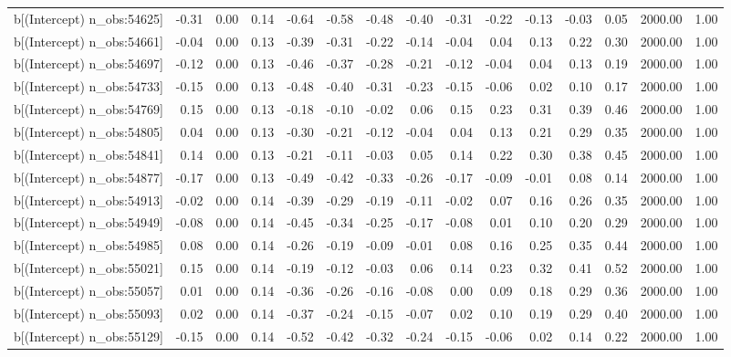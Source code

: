 \begin{table}[ht]
\begin{tabular}{rrrrrrrrrrrrrrr}
  b[(Intercept) n\_obs:54625] & -0.31 & 0.00 & 0.14 & -0.64 & -0.58 & -0.48 & -0.40 & -0.31 & -0.22 & -0.13 & -0.03 & 0.05 & 2000.00 & 1.00 \\ 
  b[(Intercept) n\_obs:54661] & -0.04 & 0.00 & 0.13 & -0.39 & -0.31 & -0.22 & -0.14 & -0.04 & 0.04 & 0.13 & 0.22 & 0.30 & 2000.00 & 1.00 \\ 
  b[(Intercept) n\_obs:54697] & -0.12 & 0.00 & 0.13 & -0.46 & -0.37 & -0.28 & -0.21 & -0.12 & -0.04 & 0.04 & 0.13 & 0.19 & 2000.00 & 1.00 \\ 
  b[(Intercept) n\_obs:54733] & -0.15 & 0.00 & 0.13 & -0.48 & -0.40 & -0.31 & -0.23 & -0.15 & -0.06 & 0.02 & 0.10 & 0.17 & 2000.00 & 1.00 \\ 
  b[(Intercept) n\_obs:54769] & 0.15 & 0.00 & 0.13 & -0.18 & -0.10 & -0.02 & 0.06 & 0.15 & 0.23 & 0.31 & 0.39 & 0.46 & 2000.00 & 1.00 \\ 
  b[(Intercept) n\_obs:54805] & 0.04 & 0.00 & 0.13 & -0.30 & -0.21 & -0.12 & -0.04 & 0.04 & 0.13 & 0.21 & 0.29 & 0.35 & 2000.00 & 1.00 \\ 
  b[(Intercept) n\_obs:54841] & 0.14 & 0.00 & 0.13 & -0.21 & -0.11 & -0.03 & 0.05 & 0.14 & 0.22 & 0.30 & 0.38 & 0.45 & 2000.00 & 1.00 \\ 
  b[(Intercept) n\_obs:54877] & -0.17 & 0.00 & 0.13 & -0.49 & -0.42 & -0.33 & -0.26 & -0.17 & -0.09 & -0.01 & 0.08 & 0.14 & 2000.00 & 1.00 \\ 
  b[(Intercept) n\_obs:54913] & -0.02 & 0.00 & 0.14 & -0.39 & -0.29 & -0.19 & -0.11 & -0.02 & 0.07 & 0.16 & 0.26 & 0.35 & 2000.00 & 1.00 \\ 
  b[(Intercept) n\_obs:54949] & -0.08 & 0.00 & 0.14 & -0.45 & -0.34 & -0.25 & -0.17 & -0.08 & 0.01 & 0.10 & 0.20 & 0.29 & 2000.00 & 1.00 \\ 
  b[(Intercept) n\_obs:54985] & 0.08 & 0.00 & 0.14 & -0.26 & -0.19 & -0.09 & -0.01 & 0.08 & 0.16 & 0.25 & 0.35 & 0.44 & 2000.00 & 1.00 \\ 
  b[(Intercept) n\_obs:55021] & 0.15 & 0.00 & 0.14 & -0.19 & -0.12 & -0.03 & 0.06 & 0.14 & 0.23 & 0.32 & 0.41 & 0.52 & 2000.00 & 1.00 \\ 
  b[(Intercept) n\_obs:55057] & 0.01 & 0.00 & 0.14 & -0.36 & -0.26 & -0.16 & -0.08 & 0.00 & 0.09 & 0.18 & 0.29 & 0.36 & 2000.00 & 1.00 \\ 
  b[(Intercept) n\_obs:55093] & 0.02 & 0.00 & 0.14 & -0.37 & -0.24 & -0.15 & -0.07 & 0.02 & 0.10 & 0.19 & 0.29 & 0.40 & 2000.00 & 1.00 \\ 
  b[(Intercept) n\_obs:55129] & -0.15 & 0.00 & 0.14 & -0.52 & -0.42 & -0.32 & -0.24 & -0.15 & -0.06 & 0.02 & 0.14 & 0.22 & 2000.00 & 1.00 \\ 

\end{tabular}
\end{table}

